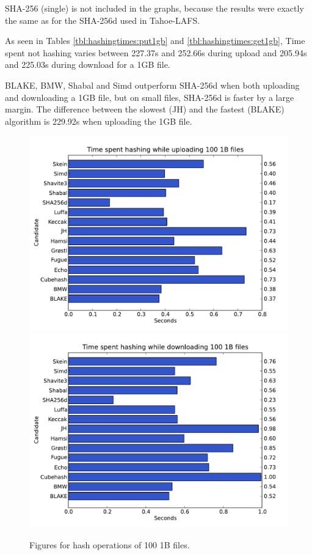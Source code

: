 \documentclass[english,12pt,a4paper]{book}
\begin{document}
\ac{SHA}-256 (single) is not included in the graphs, because the results were
exactly the same as for the \ac{SHA}-256d used in Tahoe-\ac{LAFS}.

As seen in Tables \ref{tbl:hashingtimes:put1gb} and
\ref{tbl:hashingtimes:get1gb}, Time spent not hashing varies between 227.37s and
252.66s during upload and 205.94s and 225.03s during download for a 1GB file.

BLAKE, \ac{BMW}, Shabal and Simd outperform \ac{SHA}-256d when both uploading
and downloading a 1GB file, but on small files, \ac{SHA}-256d is faster by a
large margin. The difference between the slowest (JH) and the fastest (BLAKE)
algorithm is 229.92s when uploading the 1GB file.







\begin{figure}[h!]
    \centering
    \includegraphics[width=0.9\columnwidth]
        {graphs/Timespenthashingwhileuploading1001Bfiles.pdf}
    \includegraphics[width=0.9\columnwidth]
        {graphs/Timespenthashingwhiledownloading1001Bfiles.pdf}
    \caption{Figures for hash operations of 100 1B files.}
    \label{fig:graph:1001b}
\end{figure}
\end{document}
